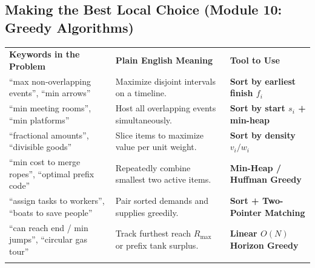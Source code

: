 \documentclass[11pt,a4paper]{article}
\begin{document}
\subsection{Making the Best Local Choice (Module 10: Greedy Algorithms)}
\begingroup\footnotesize{}
\begin{tabularx}{\textwidth}{>{\raggedright\arraybackslash}p{4.4cm} >{\raggedright\arraybackslash}X >{\raggedright\arraybackslash\bfseries}p{4.0cm}}
\arrayrulecolor{primaryblue}\toprule[1.1pt]
\rowcolor{primaryblue!10}
\textcolor{primaryblue}{\textbf{Keywords in the Problem}} & \textcolor{primaryblue}{\textbf{Plain English Meaning}} & \textcolor{primaryblue}{\textbf{Tool to Use}} \\
\arrayrulecolor{codeframe}\midrule[0.6pt]
``max non-overlapping events'', ``min arrows'' & Maximize disjoint intervals on a timeline. & Sort by earliest finish $f_i$ \\
``min meeting rooms'', ``min platforms'' & Host all overlapping events simultaneously. & Sort by start $s_i$ + min-heap \\
``fractional amounts'', ``divisible goods'' & Slice items to maximize value per unit weight. & Sort by density $v_i / w_i$ \\
``min cost to merge ropes'', ``optimal prefix code'' & Repeatedly combine smallest two active items. & Min-Heap / Huffman Greedy \\
``assign tasks to workers'', ``boats to save people'' & Pair sorted demands and supplies greedily. & Sort + Two-Pointer Matching \\
``can reach end / min jumps'', ``circular gas tour'' & Track furthest reach $R_{\max}$ or prefix tank surplus. & Linear $O(N)$ Horizon Greedy \\
\arrayrulecolor{primaryblue}\bottomrule[1.1pt]
\end{tabularx}\endgroup
\end{document}
